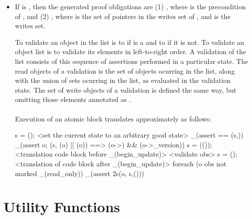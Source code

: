 \documentclass[preprint,nocopyrightspace]{sigplanconf}
\begin{document}
{{\begin{itemize}
\begin{itemize}
\item If  is , then the generated proof
obligations are (1) , where  is the precondition
of , and (2) , where  is the set
of pointers in the writes set of , and  is the writes
set.


To validate an object  in the list is to 
 if  is a \vcc{\claim} and to
 if it is not.
To validate an object list is to validate its elements in
left-to-right order. A validation of the list consists of this
sequence of assertions performed in a particular state. The read
objects of a validation is the set of objects ocurring in the list,
along with the union of sets ocurring in the list, as evaluated in the
validation state. The set of write objects of a validation is defined
the same way, but omitting those elements annotated
as .
\\\\

Execution of an atomic block translates approximately as follows:
\begin{VCC}
\state s = \now();
<set the current state to an arbitrary good state>
_(assert \me == \at(s,\me))
_(assert \forall \object o; \at(s, \wrapped(o) || \mutable(o))
    ==> \unchanged(o->\version) && \unchanged(o->\volatile_version))
s = \stutter(\now());
<translation code block before _(begin_update)>
<validate obs>
s = \now();
<translation of code block after _(begin_update)>
foreach (\object o \in obs not marked _(read_only))
  _(assert \inv2s(o, s,\now()))
\end{VCC}


\end{itemize}


\section{Utility Functions}


\end{itemize}}}
\end{document}

